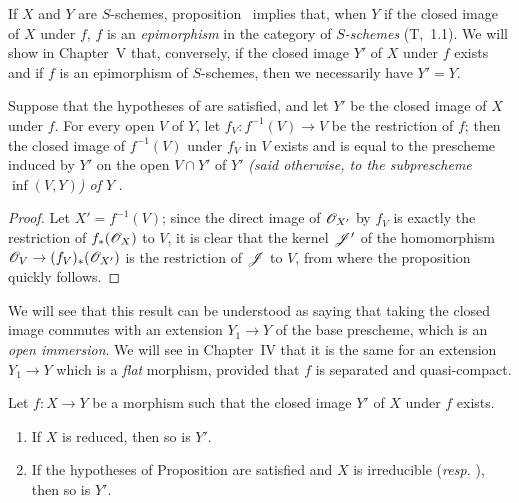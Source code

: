 \begin{rmk}[9.5.7]
\label{1.9.5.7}
If $X$ and $Y$ are $S$-schemes, proposition~ implies that, when $Y$ if the closed image of $X$ under $f$, $f$ is an \emph{epimorphism} in the category of \emph{$S$-schemes} (T,~1.1).
We will show in Chapter~V that, conversely, if the closed image $Y'$ of $X$ under $f$ exists and if $f$ is an epimorphism of $S$-schemes, then we necessarily have $Y'=Y$.
\end{rmk}

\begin{prop}[9.5.8]
\label{1.9.5.8}
Suppose that the hypotheses of  are satisfied, and let $Y'$ be the closed image of $X$ under $f$.
For every open $V$ of $Y$, let $f_V:f^{-1}(V)\to V$ be the restriction of $f$; then the closed image of $f^{-1}(V)$ under $f_V$ in $V$ exists and is equal to the prescheme induced by $Y'$ on the open $V\cap Y'$ of $Y'$ \emph{(said otherwise, to the subprescheme $\inf(V,Y)$) of $Y$ }.
\end{prop}

\begin{proof}
\label{proof-1.9.5.8}
Let $X'=f^{-1}(V)$; since the direct image of $\mathscr{O}_{X'}$ by $f_V$ is exactly the restriction of $f_*(\mathscr{O}_X)$ to $V$, it is clear that the kernel $\mathscr{J}'$ of the homomorphism $\OO_V\to(f_V)_*(\OO_{X'})$ is the restriction of $\mathscr{J}$ to $V$, from where the proposition quickly follows.
\end{proof}

We will see that this result can be understood as saying that taking the closed image commutes with an extension $Y_1\to Y$ of the base prescheme, which is an \emph{open immersion}.
We will see in Chapter~IV that it is the same for an extension $Y_1\to Y$ which is a \emph{flat} morphism, provided that $f$ is separated and quasi-compact.

\begin{prop}[9.5.9]
\label{1.9.5.9}
Let $f:X\to Y$ be a morphism such that the closed image $Y'$ of $X$ under $f$ exists.
\begin{enumerate}[label=\emph{(\roman*)}]
  \item If $X$ is reduced, then so is $Y'$.
  \item If the hypotheses of Proposition  are satisfied and $X$ is irreducible (\emph{resp.} ), then so is $Y'$.
\end{enumerate}
\end{prop}

